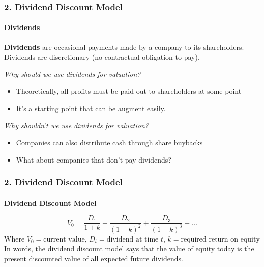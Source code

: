 \documentclass{beamer}
\begin{document}
\begin{frame}[t]
    \frametitle{2. Dividend Discount Model}
    \framesubtitle{Dividends}

    \textbf{Dividends} are occasional payments made by a company to its shareholders. 
    Dividends are discretionary (no contractual obligation to pay).\\
    \vspace{1em}

    \textit{Why should we use dividends for valuation?}
    \begin{itemize}
        \item Theoretically, all profits must be paid out to shareholders at some point
        \item It's a starting point that can be augment easily.
    \end{itemize}

    \textit{Why shouldn't we use dividends for valuation?}
    \begin{itemize}
        \item Companies can also distribute cash through share buybacks
        \item What about companies that don't pay dividends?
    \end{itemize}

\end{frame}

\begin{frame}[t]
    \frametitle{2. Dividend Discount Model}
    \framesubtitle{}

    \textbf{Dividend Discount Model}

    $$
    V_0 = \frac{D_1}{1+k} + \frac{D_2}{(1+k)^2} + \frac{D_3}{(1+k)^3} + \ldots
    $$
    Where $V_0 = \text{current value}$, $D_t = \text{dividend at time } t$, $k = \text{required return on equity}$\\
    \vspace{1em}
    In words, the dividend discount model says that the value of equity today is the present discounted value of all expected future dividends.

\end{frame}
\end{document}

